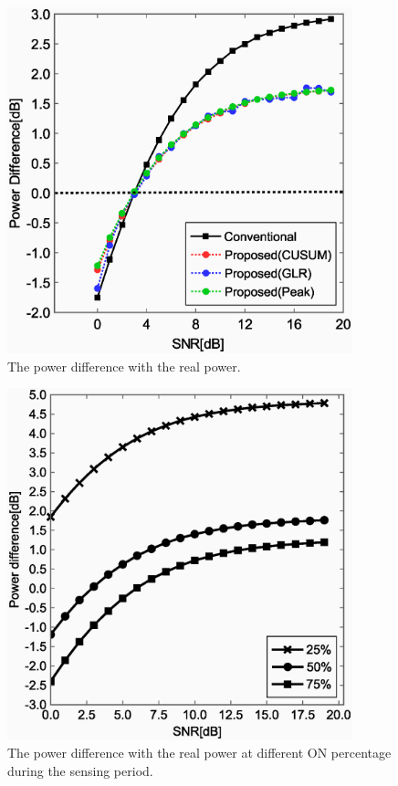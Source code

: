 \begin{figure}[!htp]
\centering
\includegraphics[width=100mm]{peak.eps}
\caption{The power difference with the real power.}
\label{Powdiff}
\end{figure}

\begin{figure}[!htp]
\centering
\includegraphics[width=100mm]{per.eps}
\caption{The power difference with the real power at different ON percentage during the sensing period.}
\label{per}
\end{figure}
